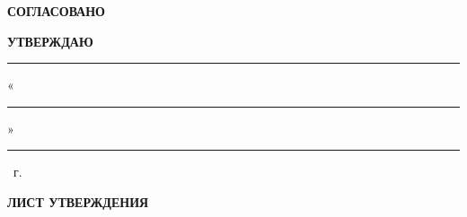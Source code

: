 \begin{center}
\begin{minipage}[t]{0.42\textwidth}
\textbf{СОГЛАСОВАНО}

\small
\scientificadvisorrole

\vspace{0.15cm}

\supervisorsignatureline{6cm}

\scientificadvisorname

\vspace{0.1cm}

\signdateblank
\ifhseHasCoSupervisor

\vspace{0.25cm}

\coscientificadvisorrole

\vspace{0.15cm}

\cosupervisorsignatureline{6cm}

\coscientificadvisorname

\vspace{0.1cm}

\signdateblank
\fi
\end{minipage}
\hspace{0.5cm}
\begin{minipage}[t]{0.42\textwidth}
\textbf{УТВЕРЖДАЮ}

\small
\academicsupervisorrole

\vspace{0.3cm}

\rule{6cm}{0.4pt}

\academicsupervisorname

\vspace{0.1cm}

«\rule{1cm}{0.4pt}» \rule{3cm}{0.4pt} \yearval~г.
\end{minipage}
\end{center}

\hseFormGap{0.6cm}

\begin{center}
\textbf{\LARGE \projectname}

\hseFormGap{0.3cm}

\textbf{\docname}

\hseFormGap{0.1cm}

\textbf{ЛИСТ УТВЕРЖДЕНИЯ}

\hseFormGap{0.1cm}

\textbf{\doccodelu}
\end{center}

